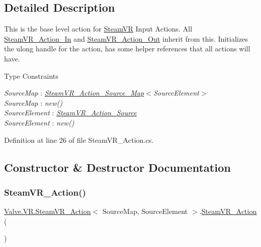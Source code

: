 \subsection{Detailed Description}
This is the base level action for \mbox{\hyperlink{class_valve_1_1_v_r_1_1_steam_v_r}{Steam\+VR}} Input Actions. All \mbox{\hyperlink{class_valve_1_1_v_r_1_1_steam_v_r___action___in}{Steam\+V\+R\+\_\+\+Action\+\_\+\+In}} and \mbox{\hyperlink{class_valve_1_1_v_r_1_1_steam_v_r___action___out}{Steam\+V\+R\+\_\+\+Action\+\_\+\+Out}} inherit from this. Initializes the ulong handle for the action, has some helper references that all actions will have. 

\begin{Desc}
\item[Type Constraints]\begin{description}
\item[{\em Source\+Map} : {\em \mbox{\hyperlink{class_valve_1_1_v_r_1_1_steam_v_r___action___source___map}{Steam\+V\+R\+\_\+\+Action\+\_\+\+Source\+\_\+\+Map}}$<$Source\+Element$>$}]\item[{\em Source\+Map} : {\em new()}]\item[{\em Source\+Element} : {\em \mbox{\hyperlink{class_valve_1_1_v_r_1_1_steam_v_r___action___source}{Steam\+V\+R\+\_\+\+Action\+\_\+\+Source}}}]\item[{\em Source\+Element} : {\em new()}]\end{description}
\end{Desc}


Definition at line 26 of file Steam\+V\+R\+\_\+\+Action.\+cs.



\subsection{Constructor \& Destructor Documentation}
\mbox{\label{class_valve_1_1_v_r_1_1_steam_v_r___action_af433e8fb310a9f16c274341055fe025f}} 
\subsubsection{\texorpdfstring{SteamVR\_Action()}{SteamVR\_Action()}}
{\footnotesize\ttfamily \mbox{\hyperlink{class_valve_1_1_v_r_1_1_steam_v_r___action}{Valve.\+V\+R.\+Steam\+V\+R\+\_\+\+Action}}$<$ Source\+Map, Source\+Element $>$.\mbox{\hyperlink{class_valve_1_1_v_r_1_1_steam_v_r___action}{Steam\+V\+R\+\_\+\+Action}} (\begin{DoxyParamCaption}{ }\end{DoxyParamCaption})}



